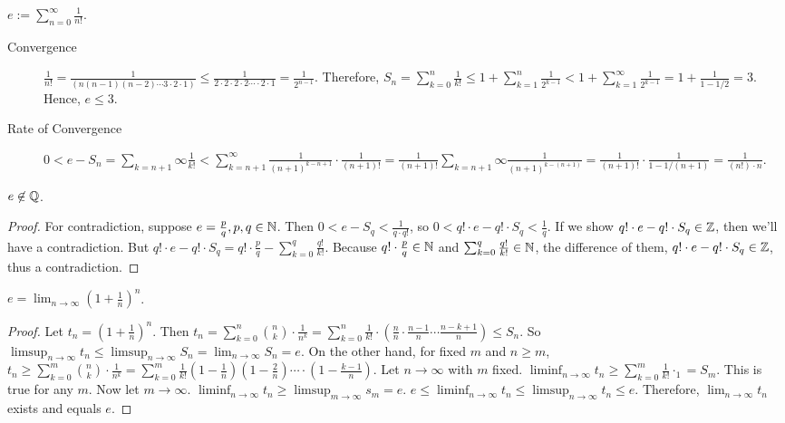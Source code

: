 \begin{definition}[e]
	$e:= \sum_{n=0}^{\infty}{\frac{1}{n!}}$.
	\begin{remark}
		\begin{description}
			\item[Convergence]
			      $\frac{1}{n!}=\frac{1}{(n(n-1)(n-2)\cdots 3\cdot 2 \cdot 1)}\le \frac{1}{2\cdot 2\cdot 2 \cdot 2 \cdots \cdot 2 \cdot 1}=\frac{1}{2^{n-1}}$. Therefore, $S_n= \sum_{k=0}^{n}{\frac{1}{k!}}\le 1+\sum_{k=1}^{n}{\frac{1}{2^{k-1}}}<1+\sum_{k=1}^{\infty }{\frac{1}{2^{k-1}}}=1+\frac{1}{1- 1/2}=3$. Hence, $e \le 3$.
			\item[Rate of Convergence]
			      $0<e-S_n=\sum_{k=n+1}{\infty}{\frac{1}{k!}}< \sum_{k=n+1}^{\infty}{\frac{1}{(n+1)^{k-n+1}}\cdot  \frac{1}{(n+1)!}}= \frac{1}{(n+1)!} \sum_{k=n+1}{\infty} \frac{1}{(n+1)^{k-(n+1)}}=\frac{1}{(n+1)!} \cdot \frac{1}{1-1/(n+1)}=\frac{1}{(n!)\cdot n}$.

		\end{description}
	\end{remark}
\end{definition}

\begin{theorem}
	\label{thm:3.32}
	$e \not\in \mathbb{Q}$.
	\begin{proof}
		For contradiction, suppose $e=\frac{p}{q}, p,q \in \mathbb{N}$.
		Then  $0<e-S_q<\frac{1}{q\cdot q!}$, so $0<q!\cdot e - q! \cdot S_q< \frac{1}{q}$. If we show $q! \cdot e - q! \cdot S_q \in \mathbb{Z}$, then we'll have a contradiction.
		But $q! \cdot e - q! \cdot S_q=q! \cdot \frac{p}{q} - \sum_{k=0}^{q}{\frac{q!}{k!}}$. Because $q! \cdot \frac{p}{q} \in \mathbb{N}$ and $\sum_{k=0}^{q}{\frac{q!}{k!}} \in \mathbb{N}$, the difference of them, $q! \cdot e - q! \cdot S_q \in \mathbb{Z}$, thus a contradiction.
	\end{proof}
\end{theorem}

\begin{theorem}
	\label{thm:3.31}
	$e= \lim_{n\to \infty}{(1+\frac{1}{n})^{n}}$.
	\begin{proof}
		Let $t_n=(1+\frac{1}{n})^{n}$. Then $t_n= \sum_{k=0}^{n}{\binom{n}{k} \cdot \frac{1}{n^{k}}}= \sum_{k=0}^{n}{\frac{1}{k!} \cdot (\frac{n}{n} \cdot \frac{n-1}{n} \cdots \frac{n-k+1}{n})} \le S_n$. So $\limsup_{n\to \infty}{t_n}\le \limsup_{n\to \infty}{S_n}=\lim_{n\to \infty}{S_n}=e$.
		On the other hand, for fixed $m$ and $n\ge m$, $t_n \ge \sum_{k=0}^{m}{\binom{n}{k} \cdot \frac{1}{n^{k}}}= \sum_{k=0}^{m}{\frac{1}{k!} (1-\frac{1}{n}) (1- \frac{2}{n}) \cdots \cdot (1-\frac{k-1}{n})}$. Let $n\to \infty$ with $m$ fixed.
		$\liminf_{n\to \infty}{t_n}\ge \sum_{k=0}^{m}{\frac{1}{k!} \cdot_1}=S_m$. This is true for any $m$.
		Now let $m\to \infty$. $\liminf_{n\to \infty}{t_{n}}\ge  \limsup_{m\to \infty}{s_{m}}=e$.
		$e \le \liminf_{n\to \infty}{t_{n}} \le \limsup_{n\to \infty}{t_{n}}\le e$.
		Therefore, $\lim_{n\to \infty}{t_{n}}$ exists and equals $e$.
	\end{proof}
\end{theorem}

